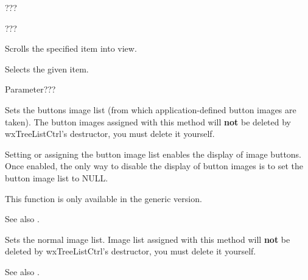 ???

\label{wxtreelistctrlsetwindowstyle}


???

\label{wxtreelistctrlscrollto}


Scrolls the specified item into view.

\label{wxtreelistctrlselectitem}


Selects the given item.

Parameter???

\label{wxtreelistctrlsetbuttonsimagelist}


Sets the buttons image list (from which application-defined button images are taken).
The button images assigned with this method will
{\bf not} be deleted by wxTreeListCtrl's destructor, you must delete it yourself.

Setting or assigning the button image list enables the display of image buttons.
Once enabled, the only way to disable the display of button images is to set
the button image list to NULL.

This function is only available in the generic version.

See also .

\label{wxtreelistctrlsetimagelist}


Sets the normal image list. Image list assigned with this method will
{\bf not} be deleted by wxTreeListCtrl's destructor, you must delete it yourself.

See also .

\label{wxtreelistctrlsetindent}

